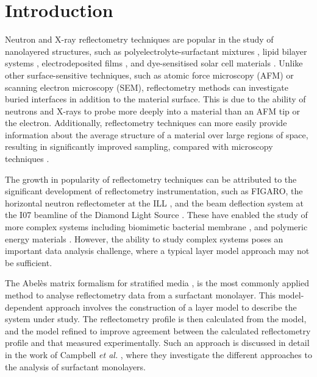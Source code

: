 \documentclass[amsmath,amssymb,twocolumn,superscriptaddress]{revtex4-1}
\begin{document}
\maketitle                        %

\section{Introduction}

Neutron and X-ray reflectometry techniques are popular in the study of
nanolayered structures, such as polyelectrolyte-surfactant
mixtures \cite{llamas_study_2018}, lipid bilayer
systems \cite{waldie_localization_2018}, electrodeposited
films \cite{beebee_effect_2019}, and dye-sensitised solar cell
materials \cite{mccree-grey_preferred_2015}.
Unlike other surface-sensitive techniques, such as atomic force microscopy
(AFM) or scanning electron microscopy (SEM), reflectometry methods can
investigate buried interfaces in addition to the material surface.
This is due to the ability of neutrons and X-rays to probe more deeply into
a material than an AFM tip or the electron.
Additionally, reflectometry techniques can more easily provide information
about the average structure of a material over large regions of space,
resulting in significantly improved sampling, compared with microscopy
techniques \cite{renaud_probing_2009}.

The growth in popularity of reflectometry techniques can be attributed to
the significant development of reflectometry instrumentation, such as
FIGARO, the horizontal neutron reflectometer at the
ILL \cite{campbell_figaro_2011}, and the beam deflection system at the I07
beamline of the Diamond Light Source \cite{arnold_implementation_2012}.
These have enabled the study of more complex systems including biomimetic
bacterial membrane \cite{barker_neutron_2016}, and polymeric energy
materials \cite{khodakarimi_x-ray_2016}.
However, the ability to study complex systems poses an important data
analysis challenge, where a typical layer model approach may not be
sufficient.

The Abel\`{e}s matrix formalism for stratified media \cite{abeles_sur_1948}, is
the most commonly applied method to analyse reflectometry data from a
surfactant monolayer.
This model-dependent approach involves the construction of a layer model to
describe the system under study.
The reflectometry profile is then calculated from the model, and the model
refined to improve agreement between the calculated reflectometry profile
and that measured experimentally.
Such an approach is discussed in detail in the work of
Campbell \emph{et al.} \cite{campbell_structure_2018}, where they investigate
the different approaches to the analysis of surfactant monolayers.
\end{document}
